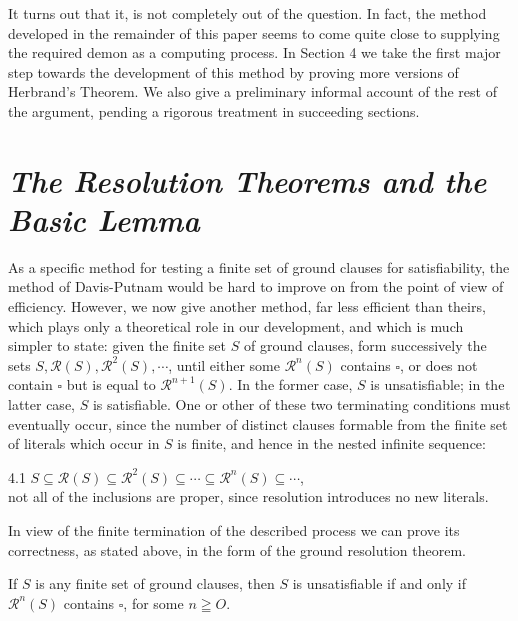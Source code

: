 \documentclass[8pt]{extarticle}
\begin{document}
It turns out that it, is not completely out of the question. In fact, the method developed in the remainder of this paper seems to come quite close to supplying the required demon as a computing process. In Section 4 we take the first major step towards the development of this method by proving more versions of Herbrand's Theorem. We also give a preliminary informal account of the rest of the argument, pending a rigorous treatment in succeeding sections.

\section{\emph{The Resolution Theorems and the Basic Lemma}}

As a specific method for testing a finite set of ground clauses for satisfiability,
the method of Davis-Putnam \cite{davis_1960} would be hard to improve on from the point
of view of efficiency. However, we now give another method, far less efficient
than theirs, which plays only a theoretical role in our development, and which
is much simpler to state: given the finite set $S$ of ground clauses, form successively
the sets $S, \mathscr{R}(S), \mathscr{R}^2(S),\dotsm $, until either some $\mathscr{R}^n(S)$ contains $\square$, or does not
contain $\square$ but is equal to $\mathscr{R}^{n+1}(S)$. In the former case, $S$ is unsatisfiable; in the
latter case, $S$ is satisfiable. One or other of these two terminating conditions
must eventually occur, since the number of distinct clauses formable from the
finite set of literals which occur in $S$ is finite, and hence in the nested infinite
sequence:

4.1 $S \subseteq \mathscr{R}(S) \subseteq \mathscr{R}^2(S) \subseteq \dotsm \subseteq \mathscr{R}^n(S) \subseteq \dotsm$,\\not all of the inclusions are proper, since resolution introduces no new literals.

In view of the finite termination of the described process we can prove its
correctness, as stated above, in the form of the ground resolution theorem. 

\newtheorem{Ground Resolution Theorem}{Theorem}
\begin{theorem}
If $S$ is any finite set of ground clauses, then $S$ is unsatisfiable if and only if $\mathscr{R}^n(S)$ contains $\square$, for some $n\geqq O$. 
\end{theorem}
\end{document}
